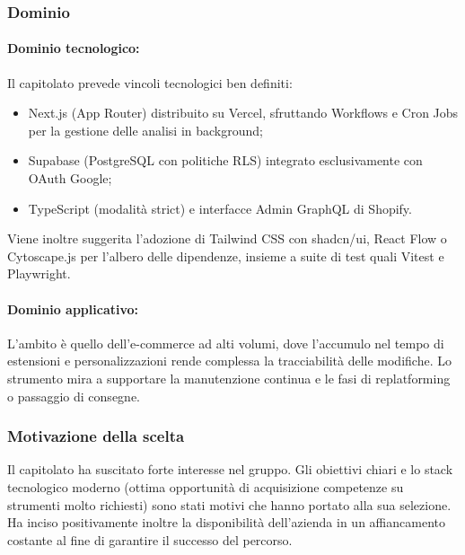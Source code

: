 \subsubsection{Dominio}
\paragraph{Dominio tecnologico:}
Il capitolato prevede vincoli tecnologici ben definiti:
\begin{itemize}
    \item Next.js (App Router) distribuito su Vercel, sfruttando Workflows e Cron Jobs per la gestione delle analisi in background;
    \item Supabase (PostgreSQL con politiche RLS) integrato esclusivamente con OAuth Google;
    \item TypeScript (modalità strict) e interfacce Admin GraphQL di Shopify.
\end{itemize}
Viene inoltre suggerita l'adozione di Tailwind CSS con shadcn/ui, React Flow o Cytoscape.js per l'albero delle dipendenze, insieme a suite di test quali Vitest e Playwright.
\paragraph{Dominio applicativo:} L'ambito è quello dell'e-commerce ad alti volumi, dove l'accumulo nel tempo di estensioni e personalizzazioni rende complessa la tracciabilità delle modifiche. Lo strumento mira a supportare la manutenzione continua e le fasi di replatforming o passaggio di consegne.

\subsubsection{Motivazione della scelta}
Il capitolato ha suscitato forte interesse nel gruppo. Gli obiettivi chiari e lo stack tecnologico moderno (ottima opportunità di acquisizione competenze su strumenti molto richiesti) sono stati motivi che hanno portato alla sua selezione. Ha inciso positivamente inoltre la disponibilità dell'azienda in un affiancamento costante al fine di garantire il successo del percorso.

